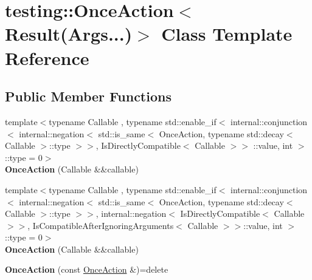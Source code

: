 \hypertarget{classtesting_1_1OnceAction_3_01Result_07Args_8_8_8_08_4}{}\section{testing\+:\+:Once\+Action$<$ Result(Args...)$>$ Class Template Reference}
\label{classtesting_1_1OnceAction_3_01Result_07Args_8_8_8_08_4}
\subsection*{Public Member Functions}
\begin{DoxyCompactItemize}
\item 
\mbox{\label{classtesting_1_1OnceAction_3_01Result_07Args_8_8_8_08_4_a8fd4189468d622987a0158f8779c8284}} 
{\footnotesize template$<$typename Callable , typename std\+::enable\+\_\+if$<$ internal\+::conjunction$<$ internal\+::negation$<$ std\+::is\+\_\+same$<$ Once\+Action, typename std\+::decay$<$ Callable $>$\+::type $>$$>$, Is\+Directly\+Compatible$<$ Callable $>$$>$ \+::value, int $>$\+::type  = 0$>$ }\\{\bfseries Once\+Action} (Callable \&\&callable)
\item 
\mbox{\label{classtesting_1_1OnceAction_3_01Result_07Args_8_8_8_08_4_a8fd4189468d622987a0158f8779c8284}} 
{\footnotesize template$<$typename Callable , typename std\+::enable\+\_\+if$<$ internal\+::conjunction$<$ internal\+::negation$<$ std\+::is\+\_\+same$<$ Once\+Action, typename std\+::decay$<$ Callable $>$\+::type $>$$>$, internal\+::negation$<$ Is\+Directly\+Compatible$<$ Callable $>$$>$, Is\+Compatible\+After\+Ignoring\+Arguments$<$ Callable $>$$>$\+::value, int $>$\+::type  = 0$>$ }\\{\bfseries Once\+Action} (Callable \&\&callable)
\item 
\mbox{\label{classtesting_1_1OnceAction_3_01Result_07Args_8_8_8_08_4_a28dd0b46528370e44de35a9bbbfa64b3}} 
{\bfseries Once\+Action} (const \mbox{\hyperlink{classtesting_1_1OnceAction}{Once\+Action}} \&)=delete
\item 
\mbox{\label{classtesting_1_1OnceAction_3_01Result_07Args_8_8_8_08_4_ae874c987a7c19b6af7f6a31c0b21e036}} 

\end{DoxyCompactItemize}
